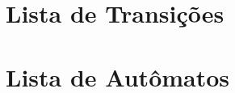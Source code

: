 
\section{Lista de Transições}
\label{chap:lista-transicoes}
	

\section{Lista de Autômatos}
\label{chap:lista-automatos}
	
